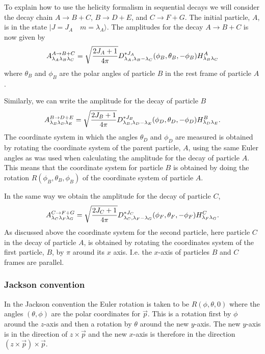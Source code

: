 To explain how to use the helicity formalism in sequential decays 
we will consider the decay chain $A\rightarrow B+C$, $B\rightarrow D+E$, 
and $C\rightarrow F+G$. The initial particle, $A$, is in the 
state $|J=J_A\quad m=\lambda_A\rangle$. The amplitudes for
the decay $A\rightarrow B+C$ is now given by
\begin{equation}
A^{A\rightarrow B+C}_{\lambda_A\lambda_B\lambda_C}=
\sqrt{2J_A+1\over 4\pi} D^{*J_A}_{\lambda_A,\lambda_B-\lambda_C}
(\phi_B,\theta_B,-\phi_B)H^{A}_{\lambda_B\lambda_C}
\end{equation}
where $\theta_B$ and $\phi_B$ are the polar angles of particle
$B$ in the rest frame of particle $A$. 

Similarly, we can write the amplitude for the decay of particle $B$
\begin{equation}
A^{B\rightarrow D+E}_{\lambda_B\lambda_D\lambda_E}=
\sqrt{2J_B+1\over 4\pi} D^{*J_B}_{\lambda_B,\lambda_D-\lambda_E}
(\phi_D,\theta_D,-\phi_D)H^{B}_{\lambda_D\lambda_E}.
\end{equation}
The coordinate system in which the angles $\theta_D$ and $\phi_D$
are measured is obtained by rotating the coordinate system of the
parent particle, $A$, using the same Euler angles as was used
when calculating the amplitude for the decay of particle $A$.
This means that the coordinate system for particle $B$ is obtained
by doing the rotation $R(\phi_B,\theta_B,\phi_B)$ of the 
coordinate system of particle $A$.

In the same way we obtain the amplitude for the decay of particle
$C$,
\begin{equation}
A^{C\rightarrow F+G}_{\lambda_C\lambda_F\lambda_G}=
\sqrt{2J_C+1\over 4\pi} D^{*J_C}_{\lambda_C,\lambda_F-\lambda_G}
(\phi_F,\theta_F,-\phi_F)H^{C}_{\lambda_F\lambda_G}.
\end{equation}
As discussed above the coordinate system for the second particle,
here particle $C$ in the decay of particle $A$, is obtained by rotating
the coordinates system of the first particle, $B$, by $\pi$ around
its $x$ axis. I.e. the $x$-axis of particles $B$ and $C$ frames are
parallel. 

\subsubsection{Jackson convention}

In the Jackson convention the Euler rotation is taken to be
$R(\phi,\theta,0)$ where the angles $(\theta,\phi)$ are the 
polar coordinates for $\vec p$. This is a 
rotation first by $\phi$ around the 
$z$-axis and then a rotation by $\theta$ around the new $y$-axis.
The new $y$-axis is in the direction of $z\times \vec p$ and 
the new $x$-axis is therefore in the direction $(z\times \vec p)\times \vec p$.

